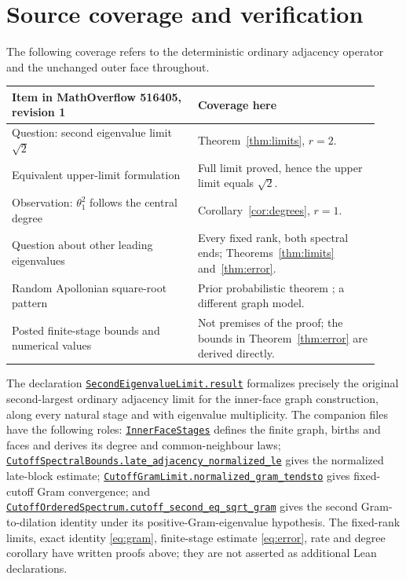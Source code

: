\documentclass[11pt]{article}
\newcommand{\upstream}[2]{\href{https://github.com/the-omega-institute/trureturing/blob/66d225eda69544653f1ca0e66cf3aea530b1a2c6/D5/S3/Combinatorics/Apollonian/#1.lean}{\texttt{#2}}}
\begin{document}
\section{Source coverage and verification}
The following coverage refers to the deterministic ordinary adjacency
operator and the unchanged outer face throughout.
\begin{center}\small
\begin{tabular}{@{}p{0.47\linewidth}p{0.46\linewidth}@{}}
\toprule
Item in MathOverflow 516405, revision 1 & Coverage here\\
\midrule
Question: second eigenvalue limit $\sqrt2$ & Theorem~\ref{thm:limits}, $r=2$.\\
Equivalent upper-limit formulation & Full limit proved, hence the upper limit equals $\sqrt2$.\\
Observation: $\theta_1^2$ follows the central degree & Corollary~\ref{cor:degrees}, $r=1$.\\
Question about other leading eigenvalues & Every fixed rank, both spectral ends; Theorems~\ref{thm:limits} and~\ref{thm:error}.\\
Random Apollonian square-root pattern & Prior probabilistic theorem \cite[Theorem 2]{frieze}; a different graph model.\\
Posted finite-stage bounds and numerical values & Not premises of the proof; the bounds in Theorem~\ref{thm:error} are derived directly.\\
\bottomrule
\end{tabular}
\end{center}

The declaration
\upstream{SecondEigenvalueLimit}{SecondEigenvalueLimit.result}
formalizes precisely the original second-largest ordinary adjacency
limit for the inner-face graph construction, along every natural stage
and with eigenvalue multiplicity.
The companion files have the following roles:
\upstream{InnerFaceStages}{InnerFaceStages} defines the finite graph,
births and faces and derives its degree and common-neighbour laws;
\upstream{CutoffSpectralBounds}{CutoffSpectralBounds.late\_adjacency\_normalized\_le}
gives the normalized late-block estimate;
\upstream{CutoffGramLimit}{CutoffGramLimit.normalized\_gram\_tendsto}
gives fixed-cutoff Gram convergence; and
\upstream{CutoffOrderedSpectrum}{CutoffOrderedSpectrum.cutoff\_second\_eq\_sqrt\_gram}
gives the second Gram-to-dilation identity under its positive-Gram-eigenvalue
hypothesis. The fixed-rank limits, exact identity \eqref{eq:gram},
finite-stage estimate \eqref{eq:error}, rate and degree corollary have
written proofs above; they are not asserted as additional Lean declarations.
\end{document}
